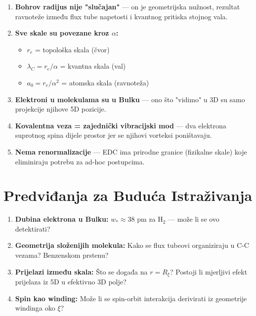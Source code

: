 \documentclass[12pt,a4paper]{article}
\begin{document}
\begin{enumerate}
    \item \textbf{Bohrov radijus nije "slučajan"} — on je geometrijska nužnost, rezultat ravnoteže između flux tube napetosti i kvantnog pritiska stojnog vala.
    
    \item \textbf{Sve skale su povezane kroz $\alpha$:}
    \begin{itemize}
        \item $r_e$ = topološka skala (čvor)
        \item $\lambda_C = r_e/\alpha$ = kvantna skala (val)
        \item $a_0 = r_e/\alpha^2$ = atomska skala (ravnoteža)
    \end{itemize}
    
    \item \textbf{Elektroni u molekulama su u Bulku} — ono što "vidimo" u 3D su samo projekcije njihove 5D pozicije.
    
    \item \textbf{Kovalentna veza = zajednički vibracijski mod} — dva elektrona suprotnog spina dijele prostor jer se njihovi vorteksi poništavaju.
    
    \item \textbf{Nema renormalizacije} — EDC ima prirodne granice (fizikalne skale) koje eliminiraju potrebu za ad-hoc postupcima.
\end{enumerate}

\section{Predviđanja za Buduća Istraživanja}

\begin{enumerate}
    \item \textbf{Dubina elektrona u Bulku:} $w_* \approx 38$ pm za H$_2$ — može li se ovo detektirati?
    
    \item \textbf{Geometrija složenijih molekula:} Kako se flux tubeovi organiziraju u C-C vezama? Benzenskom prstenu?
    
    \item \textbf{Prijelazi između skala:} Što se događa na $r = R_\xi$? Postoji li mjerljivi efekt prijelaza iz 5D u efektivno 3D polje?
    
    \item \textbf{Spin kao winding:} Može li se spin-orbit interakcija derivirati iz geometrije windinga oko $\xi$?
\end{enumerate}
\end{document}
